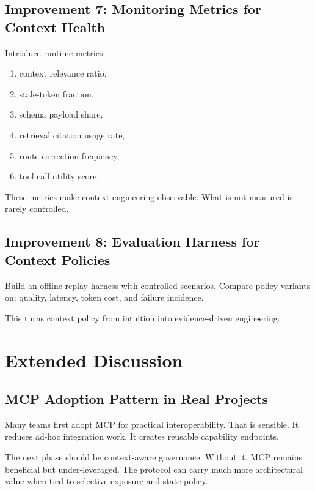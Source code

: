 \documentclass[conference]{IEEEtran}
\begin{document}
\subsection{Improvement 7: Monitoring Metrics for Context Health}

Introduce runtime metrics:

\begin{enumerate}[leftmargin=1.2em]
\item context relevance ratio,
\item stale-token fraction,
\item schema payload share,
\item retrieval citation usage rate,
\item route correction frequency,
\item tool call utility score.
\end{enumerate}

These metrics make context engineering observable.
What is not measured is rarely controlled.

\subsection{Improvement 8: Evaluation Harness for Context Policies}

Build an offline replay harness with controlled scenarios.
Compare policy variants on:
quality,
latency,
token cost,
and failure incidence.

This turns context policy from intuition into evidence-driven engineering.

\section{Extended Discussion}
\label{sec:discussion}

\subsection{MCP Adoption Pattern in Real Projects}

Many teams first adopt MCP for practical interoperability.
That is sensible.
It reduces ad-hoc integration work.
It creates reusable capability endpoints.

The next phase should be context-aware governance.
Without it,
MCP remains beneficial but under-leveraged.
The protocol can carry much more architectural value when tied to selective exposure and state policy.
\end{document}
